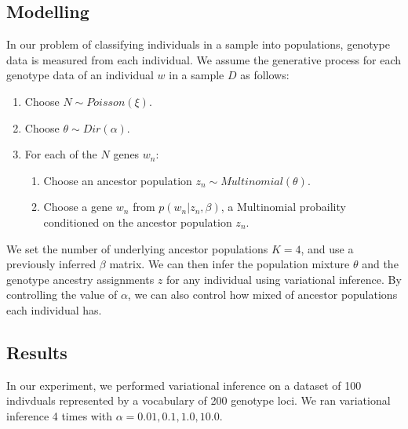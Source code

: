 \documentclass[a4paper]{article}
\begin{document}
	\subsection{Modelling}

	In our problem of classifying individuals in a sample into populations,
	genotype data is measured from each individual.
	We assume the generative process for each genotype data of an individual $w$ in a sample $D$ as follows:
	\begin{enumerate}
		\item Choose $N\sim Poisson(\xi)$.
		\item Choose $\theta \sim Dir(\alpha)$.
		\item For each of the $N$ genes $w_n$:
		\begin{enumerate}
			\item Choose an ancestor population $z_n \sim Multinomial(\theta)$.
			\item Choose a gene $w_n$ from $p(w_n|z_n,\beta)$, a Multinomial probaility conditioned on the ancestor population $z_n$.
		\end{enumerate}
	\end{enumerate}

	We set the number of underlying ancestor populations $K = 4$, and use a previously inferred $\beta$ matrix.
	We can then infer the population mixture $\theta$ and the genotype ancestry assignments $z$ for any individual using variational inference.
	By controlling the value of $\alpha$, we can also control how mixed of ancestor populations each individual has.

	\subsection{Results}
	In our experiment, we performed variational inference on a dataset of 100 indivduals represented by a vocabulary of 200 genotype loci.
	We ran variational inference 4 times with $\alpha = 0.01, 0.1, 1.0, 10.0$.
\end{document}
